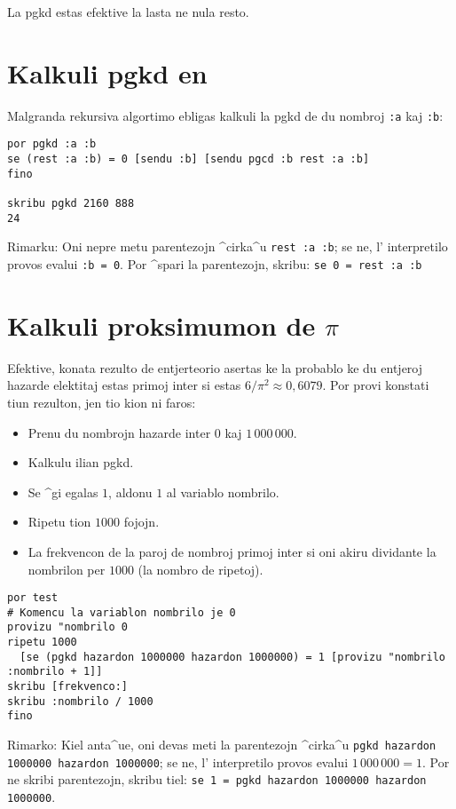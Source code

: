 La pgkd estas efektive la lasta ne nula resto.
\section{Kalkuli pgkd en \logo}
Malgranda rekursiva algortimo ebligas kalkuli la pgkd de du nombroj
\texttt{:a} kaj \texttt{:b}:
\begin{verbatim}
por pgkd :a :b
se (rest :a :b) = 0 [sendu :b] [sendu pgcd :b rest :a :b] 
fino

skribu pgkd 2160 888 
24
\end{verbatim}
Rimarku: Oni nepre metu parentezojn ^cirka^u \texttt{rest :a :b}; se
ne, l' interpretilo provos evalui \texttt{:b = 0}.  Por ^spari la
parentezojn, skribu: \texttt{se 0 = rest :a :b}

\section{Kalkuli proksimumon de $\pi$}

Efektive, konata rezulto de entjerteorio asertas ke la probablo ke du
entjeroj hazarde elektitaj estas primoj inter si estas
${6}/{\pi^2}\approx 0,6079$.  Por provi konstati tiun rezulton, jen
tio kion ni faros:
\begin{itemize}
\item Prenu du nombrojn hazarde inter $0$ kaj $1\,000\,000$.
\item Kalkulu ilian pgkd.
\item Se ^gi egalas $1$, aldonu $1$ al variablo nombrilo.
\item Ripetu tion $1000$ fojojn.
\item La frekvencon de la paroj de nombroj primoj inter si oni akiru
  dividante la nombrilon per $1000$ (la nombro de ripetoj).
\end{itemize}

\begin{verbatim}
por test
# Komencu la variablon nombrilo je 0
provizu "nombrilo 0
ripetu 1000  
  [se (pgkd hazardon 1000000 hazardon 1000000) = 1 [provizu "nombrilo :nombrilo + 1]]
skribu [frekvenco:]
skribu :nombrilo / 1000
fino
\end{verbatim}

Rimarko: Kiel anta^ue, oni devas meti la parentezojn ^cirka^u
\texttt{pgkd hazardon 1000000 hazardon 1000000}; se ne, l'
interpretilo provos evalui $1\,000\,000 = 1$.  Por ne skribi
parentezojn, skribu tiel: \texttt{se 1 = pgkd hazardon 1000000
  hazardon 1000000}.

